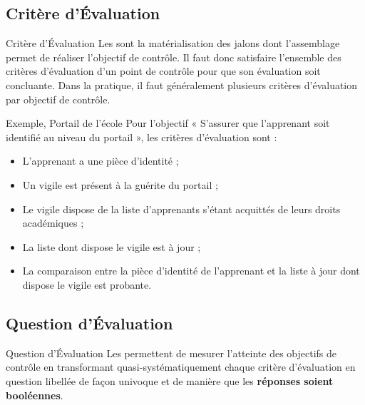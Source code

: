 \subsection{Critère d'Évaluation}

\begin{boxdef}{Critère d'Évaluation}
Les  sont la matérialisation des jalons dont
l'assemblage permet de réaliser l'objectif de contrôle. Il faut donc satisfaire
l'ensemble des critères d'évaluation d'un point de contrôle pour que son évaluation
soit concluante. Dans la pratique, il faut généralement plusieurs critères d'évaluation
par objectif de contrôle.
\end{boxdef}

\begin{boxlizbiz}{Exemple, Portail de l'école}
Pour l'objectif « S'assurer que l'apprenant soit identifié au niveau du portail »,
les critères d'évaluation sont :
\begin{itemize}
  \item L'apprenant a une pièce d'identité ;
  \item Un vigile est présent à la guérite du portail ;
  \item Le vigile dispose de la liste d'apprenants s'étant acquittés de leurs droits
    académiques ;
  \item La liste dont dispose le vigile est à jour ;
  \item La comparaison entre la pièce d'identité de l'apprenant et la liste à jour dont
    dispose le vigile est probante.
\end{itemize}
\end{boxlizbiz}

\subsection{Question d'Évaluation}

\begin{boxdef}{Question d'Évaluation}
Les  permettent de mesurer l'atteinte des objectifs
de contrôle en transformant quasi-systématiquement chaque critère d'évaluation en
question libellée de façon univoque et de manière que les \textbf{réponses soient
booléennes}.
\end{boxdef}

